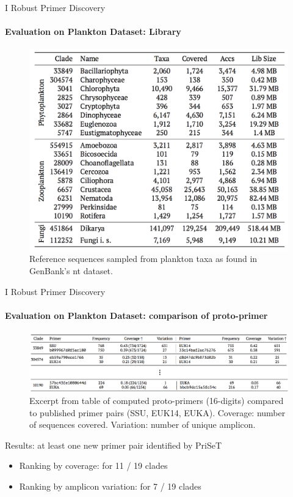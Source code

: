 \documentclass[xcolor=dvipsnames,envcountsect]{beamer}
\begin{document}
\begin{frame}{I Robust Primer Discovery}
\framesubtitle{Evaluation on Plankton Dataset: Library}
\begin{figure}
    \includegraphics[scale=.38]{plankton_data}
    \caption{Reference sequences sampled from plankton taxa as found in GenBank's nt dataset.}
\end{figure}
\end{frame}

\begin{frame}{I Robust Primer Discovery}
\framesubtitle{Evaluation on Plankton Dataset: comparison of proto-primer}
\begin{figure}\centering
    \includegraphics[scale=.47]{denovo_plankton}
    \caption{Excerpt from table of computed proto-primers (16-digits) compared to published primer pairs (SSU, EUK14, EUKA). Coverage: number of sequences covered. Variation: number of unique amplicon.}
\end{figure}
Results: at least one new primer pair identified by PriSeT
\begin{itemize}
    \item Ranking by coverage: for 11 / 19 clades %
    \item Ranking by amplicon variation: for 7 / 19 clades %
\end{itemize}
\end{frame}
\end{document}
